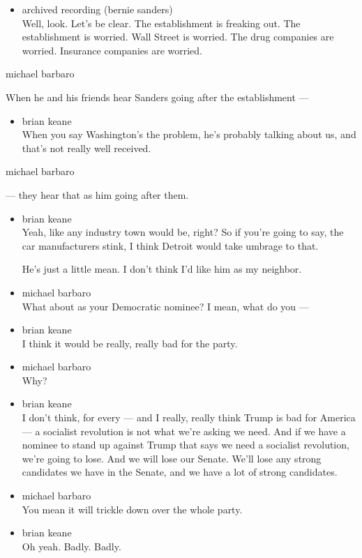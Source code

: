 \begin{itemize}
\tightlist
\item
  archived recording (bernie sanders)\\
  Well, look. Let's be clear. The establishment is freaking out. The
  establishment is worried. Wall Street is worried. The drug companies
  are worried. Insurance companies are worried.
\end{itemize}

michael barbaro

When he and his friends hear Sanders going after the establishment ---

\begin{itemize}
\tightlist
\item
  brian keane\\
  When you say Washington's the problem, he's probably talking about us,
  and that's not really well received.
\end{itemize}

michael barbaro

--- they hear that as him going after them.

\begin{itemize}
\item
  brian keane\\
  Yeah, like any industry town would be, right? So if you're going to
  say, the car manufacturers stink, I think Detroit would take umbrage
  to that.

  He's just a little mean. I don't think I'd like him as my neighbor.
\item
  michael barbaro\\
  What about as your Democratic nominee? I mean, what do you ---
\item
  brian keane\\
  I think it would be really, really bad for the party.
\item
  michael barbaro\\
  Why?
\item
  brian keane\\
  I don't think, for every --- and I really, really think Trump is bad
  for America --- a socialist revolution is not what we're asking we
  need. And if we have a nominee to stand up against Trump that says we
  need a socialist revolution, we're going to lose. And we will lose our
  Senate. We'll lose any strong candidates we have in the Senate, and we
  have a lot of strong candidates.
\item
  michael barbaro\\
  You mean it will trickle down over the whole party.
\item
  brian keane\\
  Oh yeah. Badly. Badly.
\end{itemize}

